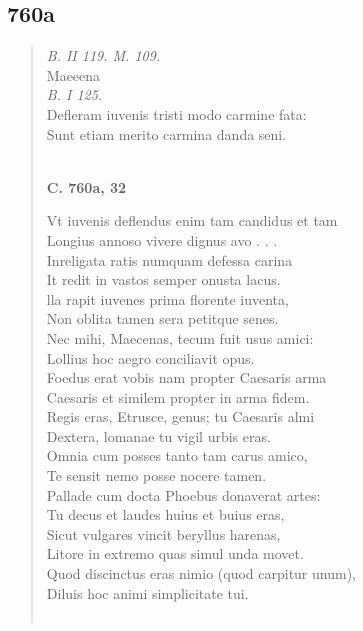 \documentclass[11pt, a4paper]{report}
\begin{document}
            \subsection*{760a}
      \begin{verse}
      \textit{B. II 119. M. 109.} \\ Maeeena \\ \textit{B. I 125.} \\ Defleram iuvenis tristi modo carmine fata: \\ Sunt etiam merito carmina danda seni. \\ 
        ﻿\pagebreak 
    \begin{center} \textbf{C. 760a, 32} \end{center} \marginpar{[236]}  \marginpar{[0]} Vt iuvenis deflendus enim tam candidus et tam \\ Longius annoso vivere dignus avo . . . \\ Inreligata ratis numquam defessa carina \\ It redit in vastos semper onusta lacus. \\ lla rapit iuvenes prima florente iuventa, \\ Non oblita tamen sera petitque senes. \\ Nec mihi, Maecenas, tecum fuit usus amici: \\ Lollius hoc aegro conciliavit opus. \\ Foedus erat vobis nam propter Caesaris arma \\ Caesaris et similem propter in arma fidem. \\ Regis eras, Etrusce, genus; tu Caesaris almi \\ Dextera, lomanae tu vigil urbis eras. \\ Omnia cum posses tanto tam carus amico, \\ Te sensit nemo posse nocere tamen. \\ Pallade cum docta Phoebus donaverat artes: \\ Tu decus et laudes huius et buius eras, \\ Sicut vulgares vincit beryllus harenas, \\ Litore in extremo quas simul unda movet. \\ Quod discinctus eras nimio (quod carpitur unum), \\ Diluis hoc animi simplicitate tui. \\ 
        ﻿\pagebreak 

\end{verse}
\end{document}
